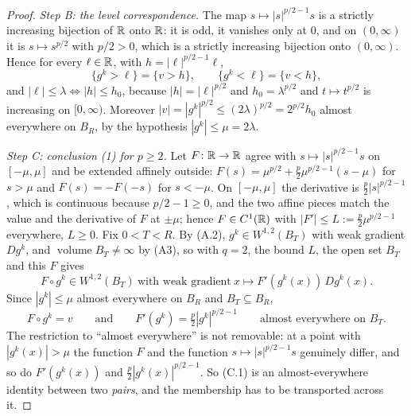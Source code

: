 \begin{proof}
\emph{Step B: the level correspondence.}  The map
$s\mapsto|s|^{p/2-1}s$ is a strictly increasing bijection of $\mathbb{R}$ onto $\mathbb{R}$: it
is odd, it vanishes only at $0$, and on $(0,\infty)$ it is $s\mapsto s^{p/2}$
with $p/2>0$, which is a strictly increasing bijection onto $(0,\infty)$.  Hence
for every $\ell\in\mathbb{R}$, with
$h=|\ell|^{p/2-1}\ell$,
\[
\{g^k>\ell\}=\{v>h\},\qquad \{g^k<\ell\}=\{v<h\},
\tag{B.1}
\]
and $|\ell|\le\lambda\iff|h|\le h_0$, because $|h|=|\ell|^{p/2}$ and
$h_0=\lambda^{p/2}$ and $t\mapsto t^{p/2}$ is increasing on $[0,\infty)$.
Moreover $|v|=|g^k|^{p/2}\le(2\lambda)^{p/2}=2^{p/2}h_0$ almost everywhere on
$B_R$, by the hypothesis $|g^k|\le\mu=2\lambda$.

\emph{Step C: conclusion (1) for $p\ge2$.}  Let $F\colon\mathbb{R}\to\mathbb{R}$ agree with
$s\mapsto|s|^{p/2-1}s$ on $[-\mu,\mu]$ and be extended affinely outside:
$F(s)=\mu^{p/2}+\tfrac p2\mu^{p/2-1}(s-\mu)$ for $s>\mu$ and $F(s)=-F(-s)$ for
$s<-\mu$.  On $[-\mu,\mu]$ the derivative is $\tfrac p2|s|^{p/2-1}$, which is
continuous because $p/2-1\ge0$, and the two affine pieces match the value and
the derivative of $F$ at $\pm\mu$; hence $F\in C^1(\mathbb{R})$ with
$|F'|\le L:=\tfrac p2\mu^{p/2-1}$ everywhere, $L\ge0$.  Fix $0<T<R$.  By (A.2),
$g^k\in W^{1,2}(B_T)$ with weak gradient $Dg^k$, and
$\operatorname{volume}B_T\ne\infty$ by (A3), so 
with $q=2$, the bound $L$, the open set $B_T$ and this $F$ gives
\[
F\circ g^k\in W^{1,2}(B_T)\ \text{with weak gradient}\
x\mapsto F'(g^k(x))\,Dg^k(x) .
\]
Since $|g^k|\le\mu$ almost everywhere on $B_R$ and $B_T\subseteq B_R$,
\[
F\circ g^k=v\qquad\text{and}\qquad F'(g^k)=\tfrac p2|g^k|^{p/2-1}
\qquad\text{almost everywhere on }B_T .
\tag{C.1}
\]
The restriction to ``almost everywhere'' is not removable: at a point with
$|g^k(x)|>\mu$ the function $F$ and the function $s\mapsto|s|^{p/2-1}s$
genuinely differ, and so do $F'(g^k(x))$ and $\tfrac p2|g^k(x)|^{p/2-1}$.  So
(C.1) is an almost-everywhere identity between two \emph{pairs}, and the
membership has to be transported across it.


\end{proof}

